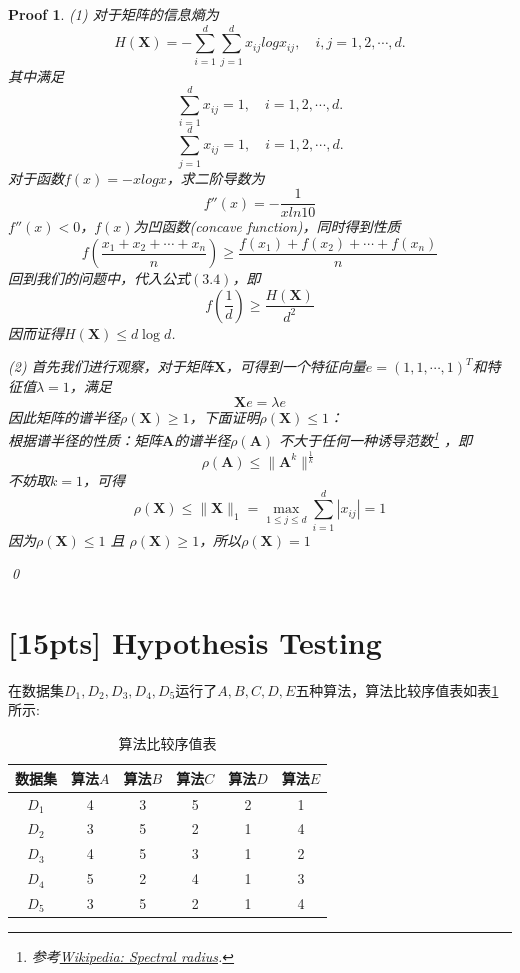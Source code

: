 \documentclass[a4paper,UTF8]{article}
\numberwithin{equation}{section}
\newtheorem*{myProof}{Proof}
\begin{document}
\begin{myProof}
(1) 对于矩阵的信息熵为
\begin{equation}
	H(\mathbf{X}) = - \sum_{i=1}^d \sum_{j=1}^d x_{ij} log x_{ij}, \quad i,j = 1,2, \cdots, d.
\end{equation}
其中满足
\[ 	\sum_{i=1}^d x_{ij} = 1,\quad i=1,2,\cdots,d. \]
\[	\sum_{j=1}^d x_{ij} = 1,\quad i=1,2,\cdots,d. \]
对于函数$f(x) = -xlogx$，求二阶导数为
\[ f''(x) = -\frac{1}{xln10} \]
$f''(x)<0$，$f(x)$为凹函数(concave function)，同时得到性质
\begin{equation} 
f(\frac{x_1+x_2+\cdots + x_n}{n}) \geq \frac{f(x_1) + f(x_2) +\cdots + f(x_n)}{n} 
\end{equation}
回到我们的问题中，代入公式$(3.4)$，即
\[ f(\frac{1}{d})  \geq \frac{H(\mathbf{X})}{d^2} \]
因而证得$H(\mathbf{X}) \leq d\log d$.

(2) 首先我们进行观察，对于矩阵$\mathbf{X}$，可得到一个特征向量$e = (1,1,\cdots,1)^T$和特征值$\lambda = 1$，满足
\[ \mathbf{X} e = \lambda e \]
因此矩阵的谱半径$\rho(\mathbf{X}) \geq 1$，下面证明$\rho(\mathbf{X}) \leq 1$：\\
根据谱半径的性质：矩阵$\mathbf{A}$的谱半径$\rho(\mathbf{A})$ 不大于任何一种诱导范数\footnote{参考\href{https://en.wikipedia.org/wiki/Spectral_radius}{Wikipedia: Spectral radius}.} ，即
\[ \rho(\mathbf{A}) \leq \lVert \mathbf{A}^k \rVert ^{\frac{1}{k}}  \]
不妨取$k=1$，可得
\begin{equation}
\rho(\mathbf{X}) \leq \lVert \mathbf{X} \rVert_1 = \max_{1 \leq j \leq d} \sum_{i=1}^d |x_{ij} |  = 1
\end{equation}
因为$\rho(\mathbf{X})  \leq 1$ 且 $ \rho(\mathbf{X}) \geq 1 $，所以$\rho(\mathbf{X})=1$

\qed
\end{myProof}
\newpage
\section{[15pts] Hypothesis Testing} 
在数据集$D_1,D_2,D_3,D_4,D_5$运行了$A,B,C,D,E$五种算法，算法比较序值表如表\ref{table:ranking}所示:
\begin{table}[h]
\centering
\caption{算法比较序值表} \vspace{2mm}
\label{table:ranking}
\begin{tabular}{c|c c c c c}\hline
数据集 		& 算法$A$  	&算法$B$  	& 算法$C$ 	& 算法$D$  	&算法$E$ 	\\ \hline
$D_1$ 		& 4 		&  3  		& 5  		&  2 		& 1			\\
$D_2$ 		& 3 		&  5  		& 2  		&  1 		& 4			\\
$D_3$ 		& 4 		&  5  		& 3  		&  1 		& 2			\\ 
$D_4$ 		& 5 		&  2  		& 4  		&  1 		& 3			\\ 
$D_5$ 		& 3 		&  5  		& 2  		&  1 		& 4			\\ \hline
\end{tabular}
\end{table}
\end{document}

